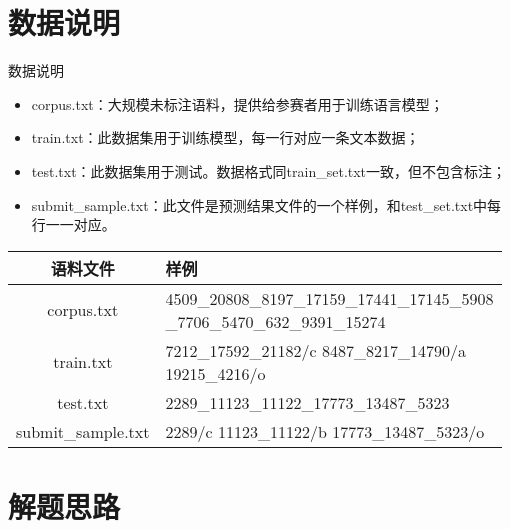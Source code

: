 \documentclass[9pt,aspectratio=169]{ctexbeamer}
\begin{document}
	\section{数据说明}
	
	\begin{frame}{数据说明}
		\begin{itemize}
			\item corpus.txt：大规模未标注语料，提供给参赛者用于训练语言模型；
			\item train.txt：此数据集用于训练模型，每一行对应一条文本数据；
			\item test.txt：此数据集用于测试。数据格式同train\_set.txt一致，但不包含标注；
			\item submit\_sample.txt：此文件是预测结果文件的一个样例，和test\_set.txt中每行一一对应。
		\end{itemize}
		\begin{table}[]
			\begin{tabular}{|c|l|}
				\hline
				语料文件               & 样例                                                                         \\
				\hline
				corpus.txt         & \makecell[l]{4509\_20808\_8197\_17159\_17441\_17145\_5908\\\_7706\_5470\_632\_9391\_15274} \\
				\hline
				train.txt          & \makecell[l]{7212\_17592\_21182/c  8487\_8217\_14790/a \\ 19215\_4216/o}                    \\
				\hline
				test.txt           & 2289\_11123\_11122\_17773\_13487\_5323                              \\
				\hline
				submit\_sample.txt & 2289/c 11123\_11122/b 17773\_13487\_5323/o         \\
				\hline
				                
			\end{tabular}
		\end{table}
	\end{frame}
	
	\section{解题思路}
	
\end{document}
